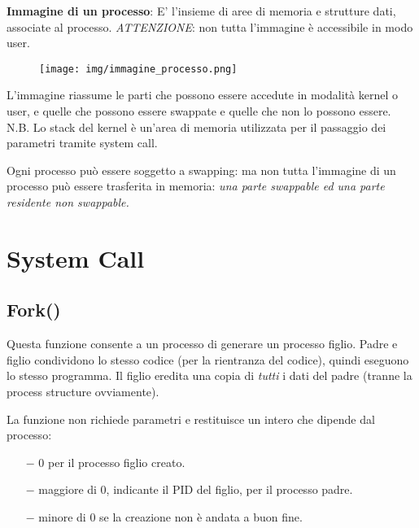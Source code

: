 \documentclass{article}
\begin{document}
\noindent \textbf{Immagine di un processo}: E' l'insieme di aree di memoria e
strutture dati, associate al processo. \textit{ATTENZIONE}: non tutta 
l'immagine è accessibile in modo user.

\begin{figure}[h!]
    \begin{center}
        \texttt{[image: img/immagine\_processo.png]}  
    \end{center}
\end{figure}

\noindent L'immagine riassume le parti che possono essere accedute in modalità 
kernel o user, e quelle che possono essere swappate e quelle che non lo possono
essere. 
N.B. Lo stack del kernel è un'area di memoria utilizzata per il passaggio dei 
parametri tramite system call.

\noindent Ogni processo può essere soggetto a swapping:
ma non tutta l'immagine di un processo può essere trasferita in memoria: 
\textit{una parte swappable ed una parte residente non swappable.}

\pagebreak
\section{System Call}
\subsection{Fork()}

\noindent{}
\medskip

\noindent Questa funzione consente a un processo di generare un processo figlio.
Padre e figlio condividono lo stesso codice (per la rientranza del codice),
quindi eseguono lo stesso programma. Il figlio eredita una copia di \textit{tutti}
i dati del padre (tranne la process structure ovviamente).

La funzione non richiede parametri e restituisce un intero che dipende dal processo:
\begin{itemize}
    \item[$-$] 0 per il processo figlio creato.
    \item[$-$] maggiore di 0, indicante il PID del figlio, per il processo padre.
    \item[$-$] minore di 0 se la creazione non è andata a buon fine.
\end{itemize}
\end{document}
